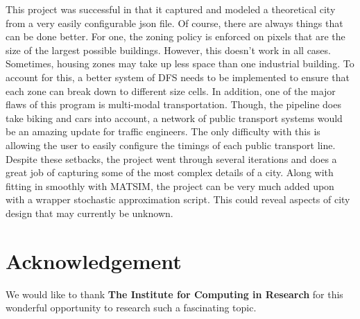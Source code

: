 \documentclass[11pt]{article}
\begin{document}
\begin{multicols}{2}
    \quad This project was successful in that it captured and modeled a theoretical city from a very easily configurable json file. Of course, there are always things that can be done better. For one, the zoning policy is enforced on pixels that are the size of the largest possible buildings. However, this doesn't work in all cases. Sometimes, housing zones may take up less space than one industrial building. To account for this, a better system of DFS needs to be implemented to ensure that each zone can break down to different size cells. In addition, one of the major flaws of this program is multi-modal transportation. Though, the pipeline does take biking and cars into account, a network of public transport systems would be an amazing update for traffic engineers. The only difficulty with this is allowing the user to easily configure the timings of each public transport line. Despite these setbacks, the project went through several iterations and does a great job of capturing some of the most complex details of a city. Along with fitting in smoothly with MATSIM, the project can be very much added upon with a wrapper stochastic approximation script. This could reveal aspects of city design that may currently be unknown.

    \section*{Acknowledgement}
    We would like to thank \textbf{The Institute for Computing in Research} for this wonderful opportunity to research such a fascinating topic.
\end{multicols}

\pagebreak



\end{document}
